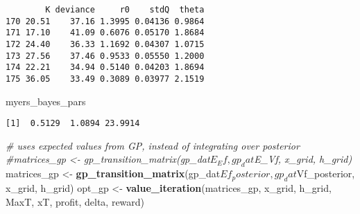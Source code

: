 \documentclass[author-year, review]{elsarticle} %
\newenvironment{Shaded}{}{}
\newcommand{\KeywordTok}[1]{\textcolor[rgb]{0.00,0.44,0.13}{\textbf{{#1}}}}
\newcommand{\DataTypeTok}[1]{\textcolor[rgb]{0.56,0.13,0.00}{{#1}}}
\newcommand{\StringTok}[1]{\textcolor[rgb]{0.25,0.44,0.63}{{#1}}}
\newcommand{\CommentTok}[1]{\textcolor[rgb]{0.38,0.63,0.69}{\textit{{#1}}}}
\newcommand{\NormalTok}[1]{{#1}}
\begin{document}
\begin{verbatim}
        K deviance     r0    stdQ  theta
170 20.51    37.16 1.3995 0.04136 0.9864
171 17.10    41.09 0.6076 0.05170 1.8684
172 24.40    36.33 1.1692 0.04307 1.0715
173 27.56    37.46 0.9533 0.05550 1.2000
174 22.21    34.94 0.5140 0.04203 1.8694
175 36.05    33.49 0.3089 0.03977 2.1519
\end{verbatim}

\begin{Shaded}
\begin{Highlighting}[]
\NormalTok{myers_bayes_pars}
\end{Highlighting}
\end{Shaded}

\begin{verbatim}
[1]  0.5129  1.0894 23.9914
\end{verbatim}

\begin{Shaded}
\end{Shaded}

\begin{Shaded}
\begin{Highlighting}[]
\CommentTok{# uses expected values from GP, instead of integrating over posterior}
\CommentTok{#matrices_gp <- gp_transition_matrix(gp_dat$E_Ef, gp_dat$E_Vf, x_grid, h_grid)}
\NormalTok{matrices_gp <- }\KeywordTok{gp_transition_matrix}\NormalTok{(gp_dat$Ef_posterior, gp_dat$Vf_posterior, x_grid, h_grid) }
\NormalTok{opt_gp <- }\KeywordTok{value_iteration}\NormalTok{(matrices_gp, x_grid, h_grid, MaxT, xT, profit, delta, reward)}
\end{Highlighting}
\end{Shaded}
\end{document}
